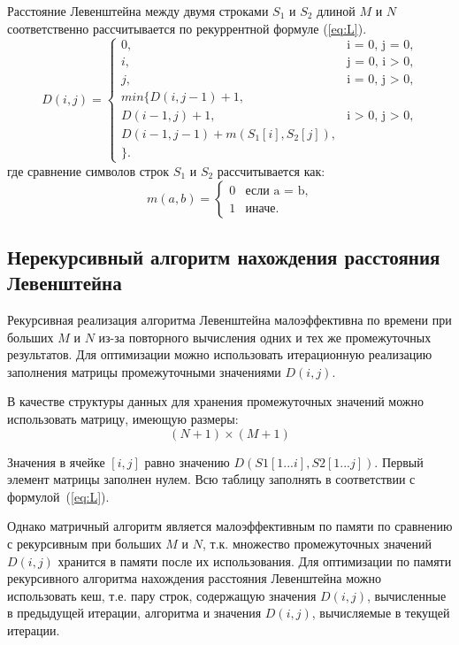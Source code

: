 Расстояние Левенштейна между двумя строками $S_{1}$ и $S_{2}$ длиной $M$ и $N$ соответственно рассчитывается по рекуррентной формуле (\ref{eq:L}).
\begin{equation}
	\label{eq:L}
	D(i, j) =
	\begin{cases}
		0, &\text{i = 0, j = 0,}\\
		i, &\text{j = 0, i > 0,}\\
		j, &\text{i = 0, j > 0,}\\
		min  \lbrace
			D(i, j - 1) + 1,\\
			D(i - 1, j) + 1, &\text{i > 0, j > 0,}\\
			D(i - 1, j - 1) +  m(S_{1}[i], S_{2}[j]), \\
		\rbrace.
		
	\end{cases}
\end{equation}
где сравнение символов строк $S_1$ и $S_2$ рассчитывается как:
\begin{equation}
	\label{eq:m}
	m(a, b) = \begin{cases}
		0 &\text{если a = b,}\\
		1 &\text{иначе.}
	\end{cases}
\end{equation}

\subsection{Нерекурсивный алгоритм нахождения расстояния Левенштейна}

Рекурсивная реализация алгоритма Левенштейна малоэффективна по времени при больших $M$ и $N$ из-за повторного вычисления одних и тех же промежуточных результатов.  Для оптимизации можно использовать итерационную реализацию заполнения матрицы промежуточными значениями $D(i,j)$.

В качестве структуры данных для хранения промежуточных значений можно использовать матрицу, имеющую размеры:
\begin{equation}
	\label{eq:lev-m-size}
	(N + 1) \times (M + 1)
\end{equation}

Значения в ячейке $[i, j]$ равно значению $D(S1[1...i], S2[1...j])$. Первый элемент матрицы заполнен нулем. Всю таблицу заполнять в соответствии с формулой~(\ref{eq:L}). 

Однако матричный алгоритм является малоэффективным по памяти по сравнению с рекурсивным при больших $M$ и $N$, т.к. множество промежуточных значений $D(i,j)$ хранится в памяти после их использования. Для оптимизации по памяти рекурсивного алгоритма нахождения расстояния Левенштейна можно использовать кеш, т.е. пару строк, содержащую значения $D(i,j)$, вычисленные в предыдущей итерации, алгоритма и значения $D(i,j)$, вычисляемые в текущей итерации.

